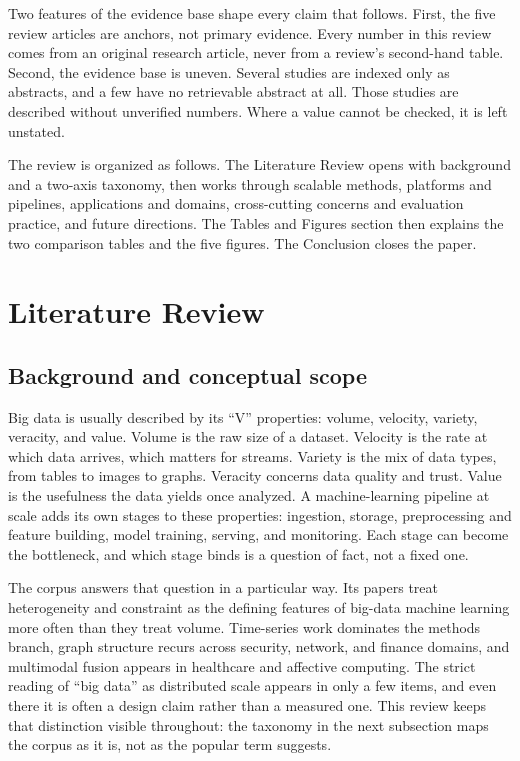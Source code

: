 \documentclass[pdflatex,sn-basic,Numbered]{sn-jnl}%
\begin{document}
Two features of the evidence base shape every claim that follows. First, the five review articles are anchors, not primary evidence. Every number in this review comes from an original research article, never from a review's second-hand table. Second, the evidence base is uneven. Several studies are indexed only as abstracts, and a few have no retrievable abstract at all. Those studies are described without unverified numbers. Where a value cannot be checked, it is left unstated.

The review is organized as follows. The Literature Review opens with background and a two-axis taxonomy, then works through scalable methods, platforms and pipelines, applications and domains, cross-cutting concerns and evaluation practice, and future directions. The Tables and Figures section then explains the two comparison tables and the five figures. The Conclusion closes the paper.

\section{Literature Review}\label{sec2}

\subsection{Background and conceptual scope}\label{subsec21}

Big data is usually described by its ``V'' properties: volume, velocity, variety, veracity, and value. Volume is the raw size of a dataset. Velocity is the rate at which data arrives, which matters for streams. Variety is the mix of data types, from tables to images to graphs. Veracity concerns data quality and trust. Value is the usefulness the data yields once analyzed. A machine-learning pipeline at scale adds its own stages to these properties: ingestion, storage, preprocessing and feature building, model training, serving, and monitoring. Each stage can become the bottleneck, and which stage binds is a question of fact, not a fixed one.

The corpus answers that question in a particular way. Its papers treat heterogeneity and constraint as the defining features of big-data machine learning more often than they treat volume. Time-series work dominates the methods branch, graph structure recurs across security, network, and finance domains, and multimodal fusion appears in healthcare and affective computing. The strict reading of ``big data'' as distributed scale appears in only a few items, and even there it is often a design claim rather than a measured one. This review keeps that distinction visible throughout: the taxonomy in the next subsection maps the corpus as it is, not as the popular term suggests.
\end{document}
